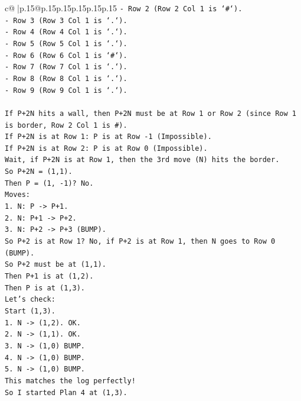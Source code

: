 \documentclass{article}
\begin{document}
{\begin{supertabular}{c@{$\;$}|p{.15\linewidth}@{}p{.15\linewidth}p{.15\linewidth}p{.15\linewidth}p{.15\linewidth}p{.15\linewidth}}
{{{\texttt{{-} Row 2 (Row 2 Col 1 is `\#`).} \\
\texttt{{-} Row 3 (Row 3 Col 1 is `.`).} \\
\texttt{{-} Row 4 (Row 4 Col 1 is `.`).} \\
\texttt{{-} Row 5 (Row 5 Col 1 is `.`).} \\
\texttt{{-} Row 6 (Row 6 Col 1 is `\#`).} \\
\texttt{{-} Row 7 (Row 7 Col 1 is `.`).} \\
\texttt{{-} Row 8 (Row 8 Col 1 is `.`).} \\
\texttt{{-} Row 9 (Row 9 Col 1 is `.`).} \\
\\ 
\texttt{If P+2N hits a wall, then P+2N must be at Row 1 or Row 2 (since Row 1 is border, Row 2 Col 1 is \#).} \\
\texttt{If P+2N is at Row 1: P is at Row {-}1 (Impossible).} \\
\texttt{If P+2N is at Row 2: P is at Row 0 (Impossible).} \\
\texttt{Wait, if P+2N is at Row 1, then the 3rd move (N) hits the border.} \\
\texttt{So P+2N = (1,1).} \\
\texttt{Then P = (1, {-}1)? No.} \\
\texttt{Moves:} \\
\texttt{1. N: P {-}> P+1.} \\
\texttt{2. N: P+1 {-}> P+2.} \\
\texttt{3. N: P+2 {-}> P+3 (BUMP).} \\
\texttt{So P+2 is at Row 1? No, if P+2 is at Row 1, then N goes to Row 0 (BUMP).} \\
\texttt{So P+2 must be at (1,1).} \\
\texttt{Then P+1 is at (1,2).} \\
\texttt{Then P is at (1,3).} \\
\texttt{Let's check:} \\
\texttt{Start (1,3).} \\
\texttt{1. N {-}> (1,2). OK.} \\
\texttt{2. N {-}> (1,1). OK.} \\
\texttt{3. N {-}> (1,0) BUMP.} \\
\texttt{4. N {-}> (1,0) BUMP.} \\
\texttt{5. N {-}> (1,0) BUMP.} \\
\texttt{This matches the log perfectly!} \\
\texttt{So I started Plan 4 at (1,3).} \\
}}}
\end{supertabular}}
\end{document}
